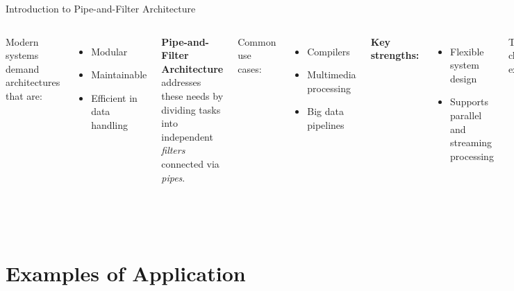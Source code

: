\documentclass[aspectratio=169, table]{beamer}
\begin{document}
\begin{frame}[fragile]{Introduction to Pipe-and-Filter Architecture}
	\vspace{20pt}
	\begin{columns}[T]
		Modern systems demand architectures that are:
		\begin{itemize}
			\item Modular
			\item Maintainable
			\item Efficient in data handling
		\end{itemize}
		
		\textbf{Pipe-and-Filter Architecture} addresses these needs by dividing tasks into independent \textit{filters} connected via \textit{pipes}.
		
		Common use cases:
		\begin{itemize}
			\item Compilers
			\item Multimedia processing
			\item Big data pipelines
		\end{itemize}
		
		\textbf{Key strengths:}
		\begin{itemize}
			\item Flexible system design
			\item Supports parallel and streaming processing
		\end{itemize}
		
		This chapter explains:
		\begin{itemize}
			\item Core concepts and components
			\item Benefits and limitations
			\item Practical examples and use cases
		\end{itemize}
		
		Focus: clear understanding without diving deep into advanced optimisations.
	\end{columns}
\end{frame}


\section{Examples of Application}
\end{document}
